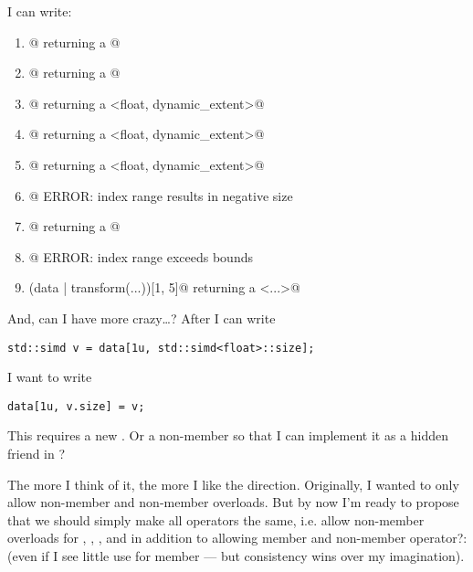 I can write:
\begin{enumerate}
  \item \lstinline@data[1u, Const<4>]@ returning a @

  \item \lstinline@cdata[1u, Const<4>]@ returning a @

  \item \lstinline@data[1, Const<4>]@ returning a \lstinline@span<float, dynamic_extent>@

  \item \lstinline@data[1u, Const<-4>]@ returning a \lstinline@span<float, dynamic_extent>@

  \item \lstinline@data[-1, Const<-4>]@ returning a \lstinline@span<float, dynamic_extent>@

  \item {}@ ERROR: index range results in negative size

  \item {}@ returning a @

  \item {}@ ERROR: index range exceeds bounds

  \item \lstinline@(data | transform(...))[1, 5]@ returning a \lstinline@subrange<...>@
\end{enumerate}

And, can I have more crazy\ldots? After I can write
\medskip\begin{lstlisting}[style=Vc]
  std::simd v = data[1u, std::simd<float>::size];
\end{lstlisting}

I want to write
\medskip\begin{lstlisting}[style=Vc]
  data[1u, v.size] = v;
\end{lstlisting}

This requires a new .
Or a non-member  so that I can implement it as a hidden friend
in ?

The more I think of it, the more I like the direction.
Originally, I wanted to only allow non-member  and non-member
 overloads.
But by now I'm ready to propose that we should simply make all operators the
same, i.e. allow non-member overloads for \code{[]}, \code{()}, \code{=}, and
\code{->} in addition to allowing member and non-member operator?: (even if I
  see little use for member  --- but consistency wins over my
imagination).



